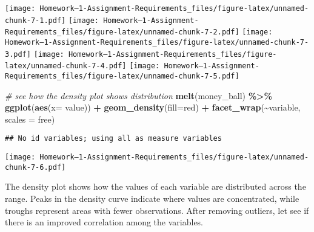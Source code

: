 \documentclass[
]{article}
\newenvironment{Shaded}{\begin{snugshade}}{\end{snugshade}}
\newcommand{\AttributeTok}[1]{\textcolor[rgb]{0.13,0.29,0.53}{#1}}
\newcommand{\CommentTok}[1]{\textcolor[rgb]{0.56,0.35,0.01}{\textit{#1}}}
\newcommand{\FunctionTok}[1]{\textcolor[rgb]{0.13,0.29,0.53}{\textbf{#1}}}
\newcommand{\NormalTok}[1]{#1}
\newcommand{\SpecialCharTok}[1]{\textcolor[rgb]{0.81,0.36,0.00}{\textbf{#1}}}
\newcommand{\StringTok}[1]{\textcolor[rgb]{0.31,0.60,0.02}{#1}}
\begin{document}
\begin{Shaded}
\end{Shaded}

\texttt{[image: Homework--1-Assignment-Requirements\_files/figure-latex/unnamed-chunk-7-1.pdf]}
\texttt{[image: Homework--1-Assignment-Requirements\_files/figure-latex/unnamed-chunk-7-2.pdf]}
\texttt{[image: Homework--1-Assignment-Requirements\_files/figure-latex/unnamed-chunk-7-3.pdf]}
\texttt{[image: Homework--1-Assignment-Requirements\_files/figure-latex/unnamed-chunk-7-4.pdf]}
\texttt{[image: Homework--1-Assignment-Requirements\_files/figure-latex/unnamed-chunk-7-5.pdf]}

\begin{Shaded}
\begin{Highlighting}[]
\CommentTok{\# see how the density plot shows distribution }
\FunctionTok{melt}\NormalTok{(money\_ball) }\SpecialCharTok{\%\textgreater{}\%} \FunctionTok{ggplot}\NormalTok{(}\FunctionTok{aes}\NormalTok{(}\AttributeTok{x=}\NormalTok{ value)) }\SpecialCharTok{+}
  \FunctionTok{geom\_density}\NormalTok{(}\AttributeTok{fill=}\StringTok{\textquotesingle{}red\textquotesingle{}}\NormalTok{) }\SpecialCharTok{+} \FunctionTok{facet\_wrap}\NormalTok{(}\SpecialCharTok{\textasciitilde{}}\NormalTok{variable, }\AttributeTok{scales =} \StringTok{\textquotesingle{}free\textquotesingle{}}\NormalTok{)}
\end{Highlighting}
\end{Shaded}

\begin{verbatim}
## No id variables; using all as measure variables
\end{verbatim}

\texttt{[image: Homework--1-Assignment-Requirements\_files/figure-latex/unnamed-chunk-7-6.pdf]}

The density plot shows how the values of each variable are distributed
across the range. Peaks in the density curve indicate where values are
concentrated, while troughs represent areas with fewer observations.
After removing outliers, let see if there is an improved correlation
among the variables.
\end{document}
